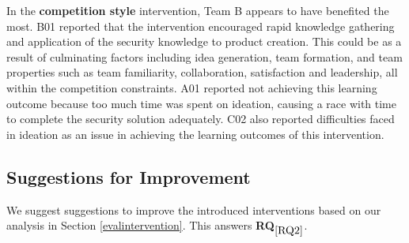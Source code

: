 \documentclass[runningheads]{llncs}
\newcommand{\hr}[1]{\textbf{RQ}$_{\ref{#1}}$}
\begin{document}
In the \textbf{competition style} intervention, Team B appears to have benefited the most. B01 reported that the intervention encouraged rapid knowledge gathering and application of the security knowledge to product creation.
This could be as a result of culminating factors including idea generation, team formation, and team properties such as team familiarity, collaboration, satisfaction and leadership, all within the competition constraints. 
A01 reported not achieving this learning outcome because too much time was spent on ideation, causing a race with time to complete the security solution adequately. C02 also reported difficulties faced in ideation as an issue in achieving the learning outcomes of this intervention.


\subsection{Suggestions for Improvement}
We suggest suggestions to improve the introduced interventions based on our analysis in Section \ref{evalintervention}. This answers \hr{RQ2}.
\end{document}
